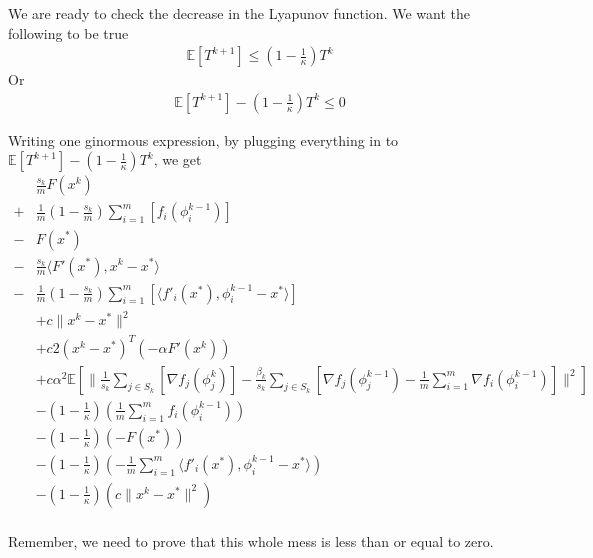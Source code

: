 \documentclass[11pt]{article}
\begin{document}
We are ready to check the decrease in the Lyapunov function. We want the following to be true
\begin{align*}
	\mathbb{E}\left[ T^{k+1} \right] \leq \left(1-\frac{1}{\kappa} \right) T^k
\end{align*}
Or
\begin{align*}
	\mathbb{E}\left[ T^{k+1} \right] - \left(1-\frac{1}{\kappa} \right) T^k \leq 0
\end{align*}

Writing one ginormous expression, by plugging everything in to $\mathbb{E}\left[ T^{k+1} \right] - \left(1-\frac{1}{\kappa} \right) T^k $, we get
\begin{align*}
	&\frac{s_k}{m}  F(x^k) \\
	+&\frac{1}{m}  \left(1 - \frac{s_k}{m} \right )\sum_{i =1}^{m} \left[  f_i(\phi_i^{k-1}) \right]\\
	-& F(x^*)\\
	-&\frac{s_k}{m}  \langle F'(x^*), x^k - x^*\rangle  \\
	-&\frac{1}{m}\left(1 - \frac{s_k}{m} \right )   \sum_{i =1}^{m} \left[   \langle f'_i(x^*), \phi_i^{k-1} - x^*\rangle \right] \\
	&+c  \|x^k - x^* \|^2  \\
		&+c 2 (x^k - x^* )^T (- \alpha  F'(x^k))\\
		&+c  \alpha^2\mathbb{E} \left[  \|\frac{1}{s_k} \sum_{j \in S_k} \left[  \nabla f_j(\phi_j^{k}) \right]- \frac{ \beta_k }{s_k} \sum_{j \in S_k} \left[  \nabla f_j(\phi^{k-1}_j) - \frac{1}{m} \sum_{i = 1}^{m }  \nabla f_i (\phi_i^{k-1}) \right]  \|^2 \right] \\
		&-\left(1-\frac{1}{\kappa} \right)(\frac{1}{m} \sum_{i =1}^{m} f_i(\phi_i^{k-1}))\\
		&-\left(1-\frac{1}{\kappa} \right)(- F(x^*) )\\
		&-\left(1-\frac{1}{\kappa} \right)( - \frac{1}{m}  \sum_{i =1}^{m} \langle f'_i(x^*), \phi_i^{k-1} - x^*\rangle )\\
		&-\left(1-\frac{1}{\kappa} \right)( c \|x^k - x^* \|^2)\\
\end{align*}

Remember, we need to prove that this whole mess is less than or equal to zero. 

\newpage
\end{document}

